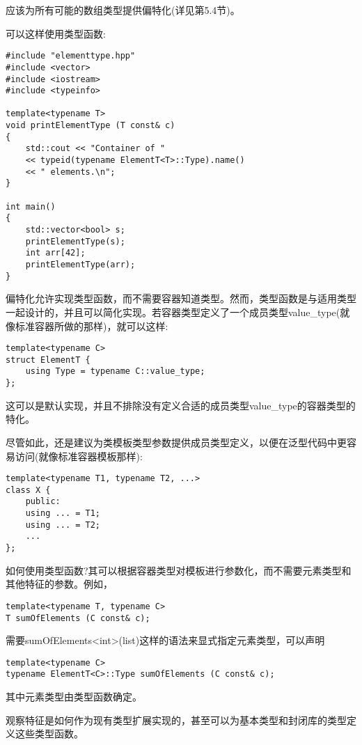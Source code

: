 应该为所有可能的数组类型提供偏特化(详见第5.4节)。

可以这样使用类型函数:

\begin{lstlisting}[style=styleCXX]
#include "elementtype.hpp"
#include <vector>
#include <iostream>
#include <typeinfo>

template<typename T>
void printElementType (T const& c)
{
	std::cout << "Container of "
	<< typeid(typename ElementT<T>::Type).name()
	<< " elements.\n";
}

int main()
{
	std::vector<bool> s;
	printElementType(s);
	int arr[42];
	printElementType(arr);
}
\end{lstlisting}

偏特化允许实现类型函数，而不需要容器知道类型。然而，类型函数是与适用类型一起设计的，并且可以简化实现。若容器类型定义了一个成员类型value\_type(就像标准容器所做的那样)，就可以这样:

\begin{lstlisting}[style=styleCXX]
template<typename C>
struct ElementT {
	using Type = typename C::value_type;
};
\end{lstlisting}

这可以是默认实现，并且不排除没有定义合适的成员类型value\_type的容器类型的特化。

尽管如此，还是建议为类模板类型参数提供成员类型定义，以便在泛型代码中更容易访问(就像标准容器模板那样):

\begin{lstlisting}[style=styleCXX]
template<typename T1, typename T2, ...>
class X {
	public:
	using ... = T1;
	using ... = T2;
	...
};
\end{lstlisting}

如何使用类型函数?其可以根据容器类型对模板进行参数化，而不需要元素类型和其他特征的参数。例如，

\begin{lstlisting}[style=styleCXX]
template<typename T, typename C>
T sumOfElements (C const& c);
\end{lstlisting}

需要sumOfElements<int>(list)这样的语法来显式指定元素类型，可以声明

\begin{lstlisting}[style=styleCXX]
template<typename C>
typename ElementT<C>::Type sumOfElements (C const& c);
\end{lstlisting}

其中元素类型由类型函数确定。

观察特征是如何作为现有类型扩展实现的，甚至可以为基本类型和封闭库的类型定义这些类型函数。

